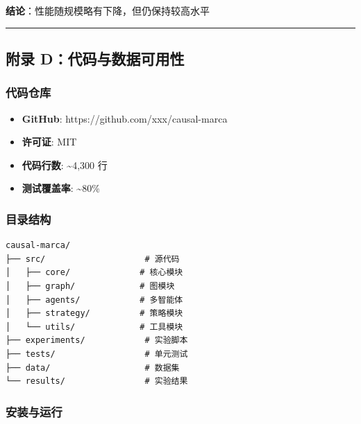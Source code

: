 \textbf{结论}：性能随规模略有下降，但仍保持较高水平

\begin{center}\rule{0.5\linewidth}{0.5pt}\end{center}

\hypertarget{ux9644ux5f55-dux4ee3ux7801ux4e0eux6570ux636eux53efux7528ux6027}{%
\subsection{附录
D：代码与数据可用性}\label{ux9644ux5f55-dux4ee3ux7801ux4e0eux6570ux636eux53efux7528ux6027}}

\hypertarget{ux4ee3ux7801ux4ed3ux5e93}{%
\subsubsection{代码仓库}\label{ux4ee3ux7801ux4ed3ux5e93}}

\begin{itemize}
\tightlist
\item
  \textbf{GitHub}: https://github.com/xxx/causal-marca
\item
  \textbf{许可证}: MIT
\item
  \textbf{代码行数}: \textasciitilde4,300 行
\item
  \textbf{测试覆盖率}: \textasciitilde80\%
\end{itemize}

\hypertarget{ux76eeux5f55ux7ed3ux6784}{%
\subsubsection{目录结构}\label{ux76eeux5f55ux7ed3ux6784}}

\begin{verbatim}
causal-marca/
├── src/                    # 源代码
│   ├── core/              # 核心模块
│   ├── graph/             # 图模块
│   ├── agents/            # 多智能体
│   ├── strategy/          # 策略模块
│   └── utils/             # 工具模块
├── experiments/            # 实验脚本
├── tests/                  # 单元测试
├── data/                   # 数据集
└── results/                # 实验结果
\end{verbatim}

\hypertarget{ux5b89ux88c5ux4e0eux8fd0ux884c}{%
\subsubsection{安装与运行}\label{ux5b89ux88c5ux4e0eux8fd0ux884c}}

